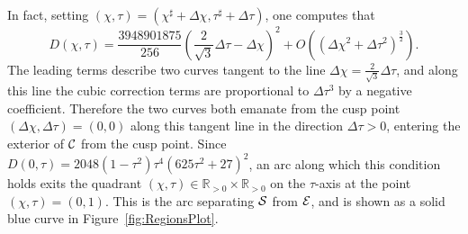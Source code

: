 In fact, setting $(\chi,\tau)=(\chi^\sharp+\Delta\chi,\tau^\sharp+\Delta\tau)$, one computes that
\begin{equation}
D(\chi,\tau)=\frac{3948901875}{256}\left(\frac{2}{\sqrt{3}}\Delta \tau-\Delta \chi\right)^2 + O((\Delta\chi^2+\Delta\tau^2)^\frac{3}{2}).
\end{equation}
The leading terms describe two curves tangent to the line $\Delta\chi=\tfrac{2}{\sqrt{3}}\Delta\tau$, and along this line the cubic correction terms are proportional to $\Delta\tau^3$ by a negative coefficient.  Therefore the two curves both emanate from the cusp point $(\Delta\chi,\Delta\tau)=(0,0)$ along this tangent line in the direction $\Delta\tau>0$, entering the exterior of $\mathcal{C}$ from the cusp point.  
Since $D(0,\tau)=2048(1-\tau^2)\tau^4(625\tau^2+27)^2$, an arc along which this condition holds exits the quadrant $(\chi,\tau)\in \mathbb{R}_{>0}\times\mathbb{R}_{>0}$ on the $\tau$-axis at the point $(\chi,\tau)=(0,1)$.  This is the arc separating $\mathcal{S}$ from $\mathcal{E}$, and is shown as a solid blue curve in Figure~\ref{fig:RegionsPlot}.


